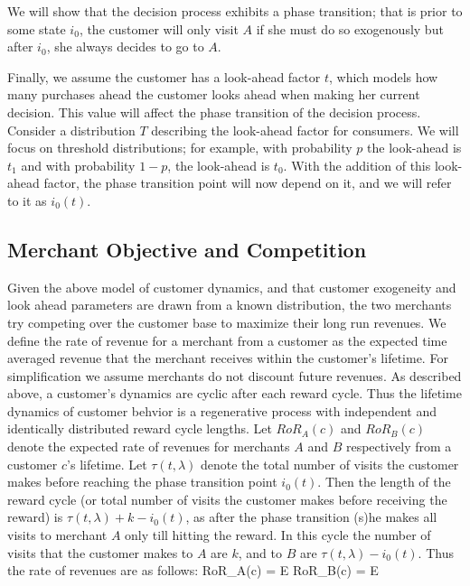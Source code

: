 We will show that the decision process exhibits a phase transition; that is prior to some state $i_0$, the customer will only visit $A$ if she must do so exogenously but after $i_0$, she always decides to go to $A$. 

Finally, we assume the customer has a look-ahead factor $t$, which models how many purchases ahead the customer looks ahead when making her current decision. 
This value will affect the phase transition of the decision process. 
Consider a distribution $T$ describing the look-ahead factor for consumers. 
We will focus on threshold distributions; for example, with probability $p$ the look-ahead is $t_1$ and with probability $1-p$, the look-ahead is $t_0$.
With the addition of this look-ahead factor, the phase transition point will now depend on it, and we will refer to it as $i_0(t)$.

\subsection{Merchant Objective and Competition}
Given the above model of customer dynamics, and that customer exogeneity and look ahead parameters are drawn from a known distribution, the two merchants try competing over the customer base to maximize their long run revenues.
We define the rate of revenue for a merchant from a customer as the expected time averaged revenue that the merchant receives within the customer's lifetime.
For simplification we assume merchants do not discount future revenues.
As described above, a customer's dynamics are cyclic after each reward cycle.
Thus the lifetime dynamics of customer behvior is a regenerative process with independent and identically distributed reward cycle lengths.
Let $RoR_A(c)$ and $RoR_B(c)$ denote the expected rate of revenues for merchants $A$ and $B$ respectively from a customer $c$'s lifetime.
Let $\tau(t, \lambda)$ denote the total number of visits the customer makes before reaching the phase transition point $i_0(t)$.
Then the length of the reward cycle (or total number of visits the customer makes before receiving the reward) is $\tau(t, \lambda) + k - i_0(t)$, as after the phase transition (s)he makes all visits to merchant $A$ only till hitting the reward.
In this cycle the number of visits that the customer makes to $A$ are $k$, and to $B$ are $\tau(t,\lambda) - i_0(t)$.
Thus the rate of revenues are as follows:
\beq
RoR_A(c) = \underset{\tau}E
\eeq
\beq
RoR_B(c) = \underset{\tau}E
\eeq

